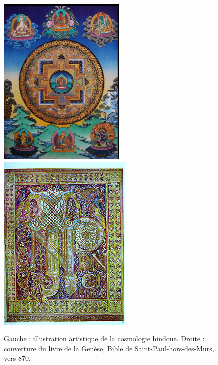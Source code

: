 \documentclass[11pt, twoside, a4paper, openright]{report}
\begin{document}
\begin{figure}
  \centering
  \includegraphics[scale=1]{cosmohindoue.png}
  \hspace{3cm}
  \includegraphics[scale=1]{genese.png}
  \caption{Gauche : illustration artistique de la cosmologie hindoue. Droite : couverture du livre de la Genèse, Bible de Saint-Paul-hors-des-Murs, vers 870.}
  \label{fig:cosmohindoue}
\end{figure}
\end{document}
